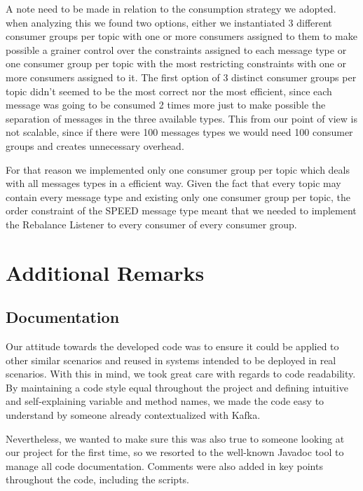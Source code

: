 \documentclass[12pt]{article}
\begin{document}
A note need to be made in relation to the consumption strategy we adopted. when analyzing this we found two options, either we instantiated 3 different consumer groups per topic with one or more consumers assigned to them to make possible a grainer control over the constraints assigned to each message type or one consumer group per topic with the most restricting constraints with one or more consumers assigned to it. The first option of 3 distinct consumer groups per topic didn't seemed to be the most correct nor the most efficient, since each message was going to be consumed 2 times more just to make possible the separation of messages in the three available types. This from our point of view is not scalable, since if there were 100 messages types we would need 100 consumer groups and creates unnecessary overhead.

For that reason we implemented only one consumer group per topic which deals with all messages types in a efficient way. Given the fact that every topic may contain every message type and existing only one consumer group per topic, the order constraint of the SPEED message type meant that we needed to implement the Rebalance Listener to every consumer of every consumer group.

\newpage
\section{Additional Remarks} %

\subsection{Documentation} %

Our attitude towards the developed code was to ensure it could be applied to other similar scenarios and reused in systems intended to be deployed in real scenarios.
With this in mind, we took great care with regards to code readability.
By maintaining a code style equal throughout the project and defining intuitive and self-explaining variable and method names, we made the code easy to understand
by someone already contextualized with Kafka.

Nevertheless, we wanted to make sure this was also true to someone looking at our project for the first time, so we resorted to the well-known Javadoc 
\cite{javadoc} tool to manage all code documentation.
Comments were also added in key points throughout the code, including the scripts.
\end{document}
